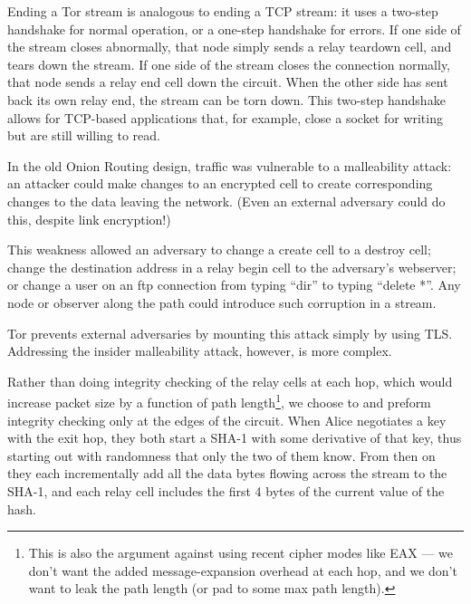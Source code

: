 \documentclass[times,10pt,twocolumn]{article}
\begin{document}
Ending a Tor stream is analogous to ending a TCP stream: it uses a
two-step handshake for normal operation, or a one-step handshake for
errors. If one side of the stream closes abnormally, that node simply
sends a relay teardown cell, and tears down the stream. If one side
of the stream closes the connection normally, that node sends a relay
end cell down the circuit. When the other side has sent back its own
relay end, the stream can be torn down. This two-step handshake allows
for TCP-based applications that, for example, close a socket for writing
but are still willing to read.


In the old Onion Routing design, traffic was vulnerable to a
malleability attack: an attacker could make changes to an encrypted
cell to create corresponding changes to the data leaving the network.
(Even an external adversary could do this, despite link encryption!)

This weakness allowed an adversary to change a create cell to a destroy
cell; change the destination address in a relay begin cell to the
adversary's webserver; or change a user on an ftp connection from
typing ``dir'' to typing ``delete *''. Any node or observer along the
path could introduce such corruption in a stream.

Tor prevents external adversaries by mounting this attack simply by
using TLS. Addressing the insider malleability attack, however, is
more complex.

Rather than doing integrity checking of the relay cells at each hop,
which would increase packet size
by a function of path length\footnote{This is also the argument against
using recent cipher modes like EAX \cite{eax} --- we don't want the added
message-expansion overhead at each hop, and we don't want to leak the path
length (or pad to some max path length).}, we choose to
and preform integrity
checking only at the edges of the circuit. When Alice negotiates a key
with the exit hop, they both start a SHA-1 with some derivative of that key,
thus starting out with randomness that only the two of them know. From
then on they each incrementally add all the data bytes flowing across
the stream to the SHA-1, and each relay cell includes the first 4 bytes
of the current value of the hash. 
\end{document}
